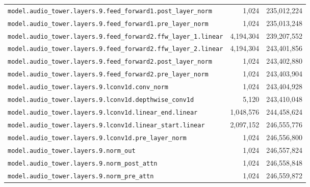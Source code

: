 \documentclass[10pt,a4paper]{article}
\theoremstyle{definition}
\begin{document}
\begin{appendices}
\begin{longtable}{p{9.5cm}rr}
\texttt{model.\allowbreak{}audio\_tower.\allowbreak{}layers.\allowbreak{}9.\allowbreak{}feed\_forward1.\allowbreak{}post\_layer\_norm} & 1,024 & 235,012,224 \\
\texttt{model.\allowbreak{}audio\_tower.\allowbreak{}layers.\allowbreak{}9.\allowbreak{}feed\_forward1.\allowbreak{}pre\_layer\_norm} & 1,024 & 235,013,248 \\
\texttt{model.\allowbreak{}audio\_tower.\allowbreak{}layers.\allowbreak{}9.\allowbreak{}feed\_forward2.\allowbreak{}ffw\_layer\_1.\allowbreak{}linear} & 4,194,304 & 239,207,552 \\
\texttt{model.\allowbreak{}audio\_tower.\allowbreak{}layers.\allowbreak{}9.\allowbreak{}feed\_forward2.\allowbreak{}ffw\_layer\_2.\allowbreak{}linear} & 4,194,304 & 243,401,856 \\
\texttt{model.\allowbreak{}audio\_tower.\allowbreak{}layers.\allowbreak{}9.\allowbreak{}feed\_forward2.\allowbreak{}post\_layer\_norm} & 1,024 & 243,402,880 \\
\texttt{model.\allowbreak{}audio\_tower.\allowbreak{}layers.\allowbreak{}9.\allowbreak{}feed\_forward2.\allowbreak{}pre\_layer\_norm} & 1,024 & 243,403,904 \\
\texttt{model.\allowbreak{}audio\_tower.\allowbreak{}layers.\allowbreak{}9.\allowbreak{}lconv1d.\allowbreak{}conv\_norm} & 1,024 & 243,404,928 \\
\texttt{model.\allowbreak{}audio\_tower.\allowbreak{}layers.\allowbreak{}9.\allowbreak{}lconv1d.\allowbreak{}depthwise\_conv1d} & 5,120 & 243,410,048 \\
\texttt{model.\allowbreak{}audio\_tower.\allowbreak{}layers.\allowbreak{}9.\allowbreak{}lconv1d.\allowbreak{}linear\_end.\allowbreak{}linear} & 1,048,576 & 244,458,624 \\
\texttt{model.\allowbreak{}audio\_tower.\allowbreak{}layers.\allowbreak{}9.\allowbreak{}lconv1d.\allowbreak{}linear\_start.\allowbreak{}linear} & 2,097,152 & 246,555,776 \\
\texttt{model.\allowbreak{}audio\_tower.\allowbreak{}layers.\allowbreak{}9.\allowbreak{}lconv1d.\allowbreak{}pre\_layer\_norm} & 1,024 & 246,556,800 \\
\texttt{model.\allowbreak{}audio\_tower.\allowbreak{}layers.\allowbreak{}9.\allowbreak{}norm\_out} & 1,024 & 246,557,824 \\
\texttt{model.\allowbreak{}audio\_tower.\allowbreak{}layers.\allowbreak{}9.\allowbreak{}norm\_post\_attn} & 1,024 & 246,558,848 \\
\texttt{model.\allowbreak{}audio\_tower.\allowbreak{}layers.\allowbreak{}9.\allowbreak{}norm\_pre\_attn} & 1,024 & 246,559,872 \\

\end{longtable}
\end{appendices}
\end{document}

